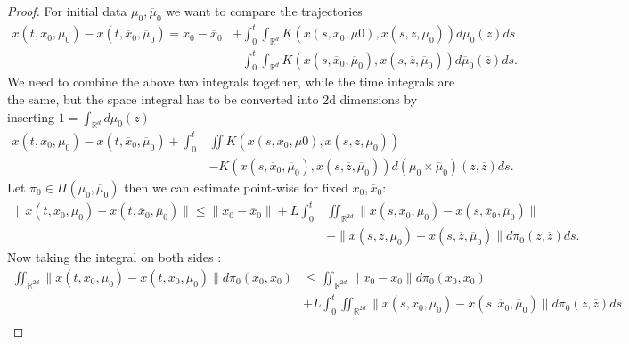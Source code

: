 \begin{proof}
  For initial data $\mu_{0} ,\overline{\mu}_0$ we want to compare the trajectories
 \begin{align*}
   x(t,x_{0},\mu_{0}) - x(t,\overline{x}_0,\overline{\mu }_0 ) = x_{0}-\overline{x}_0 &+ \int_0^{t} \int_{\mathbb{R}^{d } } K(x(s,x_{0},\mu 0),x(s,z,\mu_0))   d\mu_0(z) ds \\
                                                                                      &- \int_0^{t} \int_{\mathbb{R}^{d} } K(x(s,\overline{x}_0,\overline{\mu }_0  ),x(s,\overline{z },\overline{\mu }_0  )) d\overline{\mu}_0(\overline{z} ) ds
 .\end{align*}
 We need to combine the above two integrals together, while the time integrals are the same, but the space integral has to be converted into 2d dimensions by inserting $1 = \int_{\mathbb{R}^{d} } d\mu_0(z)$
 \begin{align*}
   x(t,x_{0},\mu_{0}) - x(t,\overline{x}_0,\overline{\mu }_0 ) + \int_0^{t} &\iint   K(x(s,x_{0},\mu 0),x(s,z,\mu_0)) \\
   &- K(x(s,\overline{x}_0,\overline{\mu }_0  ),x(s,\overline{z },\overline{\mu }_0 ))  d(\mu_0 \times \overline{\mu }_0)(z,\overline{z} ) ds
 .\end{align*}
 Let $\pi_0 \in  \Pi(\mu_{0},\overline{\mu }_0 )$ then we can estimate point-wise for fixed $x_{0},\overline{x }_0 $:
 \begin{align*}
   \|x(t,x_{0},\mu_0) - x(t,\overline{x}_0,\overline{\mu }_0  )\| \le  \|x_{0}-\overline{x}_0 \| + L\int_0^{t} &\iint_{\mathbb{R}^{2d } } \|x(s,x_{0},\mu_0) - x(s,\overline{x }_0,\overline{\mu }_0  )\| \\
                                                                                                                                       &+ \|x(s,z,\mu_0) - x(s,\overline{z},\overline{\mu }_0  )\| d\pi_0(z,\overline{z} ) ds
 .\end{align*}
 Now taking the integral on both sides : 
 \begin{align*}
   \iint_{\mathbb{R}^{2d } }  \|x(t,x_{0},\mu_0) - x(t,\overline{x}_0,\overline{\mu }_0  )\| d\pi_0(x_{0},\overline{x}_0 ) &\le \iint_{\mathbb{R}^{2d} } \|x_{0}-\overline{x}_0 \| d\pi_0(x_{0},\overline{x}_0 ) \\
                                                                                                                               &+ L\int_0^{t}  \iint_{\mathbb{R}^{2d } }  \|x(s,x_{0},\mu_0) - x(s,\overline{x }_0,\overline{\mu }_0  )\| d\pi_0(z,\overline{z} ) ds \\

\end{align*}
\end{proof}
